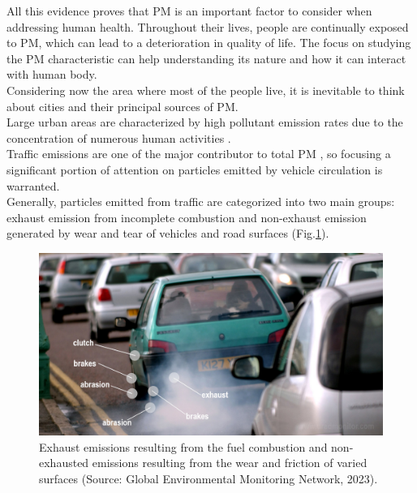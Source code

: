 All this evidence proves that PM is an important factor to consider when addressing human health. Throughout their lives, people are continually exposed to PM, which can lead to a deterioration in quality of life. 
The focus on studying the PM characteristic can help understanding its nature and how it can interact with human body. \\
Considering now the area where most of the people live, it is inevitable to think about cities and their principal sources of PM. \\
Large urban areas are characterized by high pollutant emission rates due to the concentration of numerous human activities \cite{pandis2016urban}. \\
Traffic emissions are one of the major contributor to total PM \cite{pant2013estimation}, so focusing a significant portion of attention on particles emitted by vehicle circulation is warranted. \\

Generally, particles emitted from traffic are categorized into two main groups: exhaust emission from incomplete combustion and non-exhaust emission generated by wear and tear of vehicles and road surfaces \cite{grigoratos2015brake}(Fig.\ref{fig:emissions}).

\begin{figure}[H]
\centering
    \includegraphics[scale=0.22]{images/emissions.jpg}
    \caption{Exhaust emissions resulting from the fuel combustion and non-exhausted emissions resulting from the wear and friction of varied surfaces (Source: Global Environmental Monitoring Network, 2023).
}
    \label{fig:emissions}
\end{figure}

